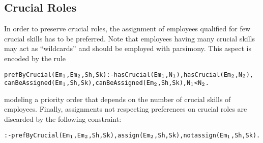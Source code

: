 \documentclass{tlp}
\begin{document}
\subsection{Crucial Roles}\label{subsec:crucial}
In order to preserve crucial roles, the assignment of employees
qualified for few crucial skills has to be preferred.
Note that employees having many crucial skills may act as ``wildcards''
and should be employed with parsimony.
This aspect is encoded by the rule
\begin{alltt}\small
 prefByCrucial(Em\(\sb{1}\),Em\(\sb{2}\),Sh,Sk) :- hasCrucial(Em\(\sb{1}\),N\(\sb{1}\)), hasCrucial(Em\(\sb{2}\),N\(\sb{2}\)),
    canBeAssigned(Em\(\sb{1}\),Sh,Sk), canBeAssigned(Em\(\sb{2}\),Sh,Sk), N\(\sb{1}\) < N\(\sb{2}\).
\end{alltt}\normalsize
modeling a priority order that depends on the number of crucial skills of employees.
Finally, assignments not respecting preferences on crucial roles
are discarded by the following constraint:
\begin{alltt}\small
 :- prefByCrucial(Em\(\sb{1}\),Em\(\sb{2}\),Sh,Sk), assign(Em\(\sb{2}\),Sh,Sk), not assign(Em\(\sb{1}\),Sh,Sk).
\end{alltt}\normalsize
\end{document}
